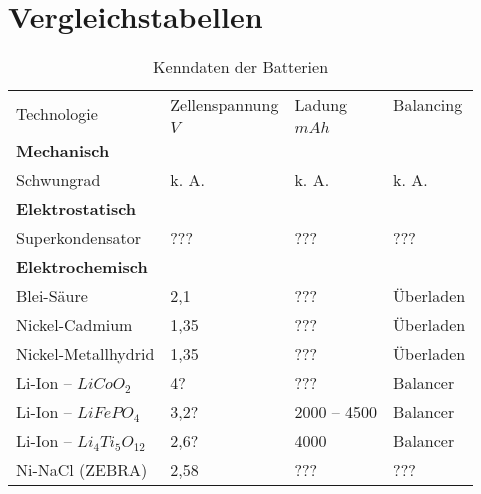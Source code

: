 \section{Vergleichstabellen}
\label{vergleichstabellen_speichertechnologien}
\begin{table}\centering
	\begin{tabularx}{\linewidth}{lXXX}
		\toprule
		\multirow{2}{*}{Technologie} & Zellenspannung           & Ladung       & Balancing \\
		                             & $V$                      & $mAh$        & $ $       \\ \midrule
		\textbf{Mechanisch}          &                          &              &  \\
		Schwungrad                   & k. A.                    & k. A.        & k. A.     \\
		\textbf{Elektrostatisch}     &                          &              &  \\
		Superkondensator             & ???                      & ???          & ???       \\
		\textbf{Elektrochemisch}     &                          &              &  \\
		Blei-Säure                   & 2,1 \cite{Sterner:2014}  & ???          & Überladen \\
		Nickel-Cadmium               & 1,35 \cite{Sterner:2014} & ???          & Überladen \\
		Nickel-Metallhydrid          & 1,35 \cite{Sterner:2014} & ???          & Überladen \\
		Li-Ion -- $LiCoO_2$          & 4? \cite{Sterner:2014}   & ???          & Balancer  \\
		Li-Ion -- $LiFePO_4$         & 3,2? \cite{Sterner:2014} & 2000 -- 4500 & Balancer  \\
		Li-Ion -- $Li_4Ti_5O_{12}$   & 2,6? \cite{Sterner:2014} & 4000         & Balancer  \\
		Ni-NaCl (ZEBRA)              & 2,58 \cite{Sterner:2014} & ???          & ???       \\ \bottomrule
	\end{tabularx}
	\caption{Kenndaten der Batterien}
\end{table}

